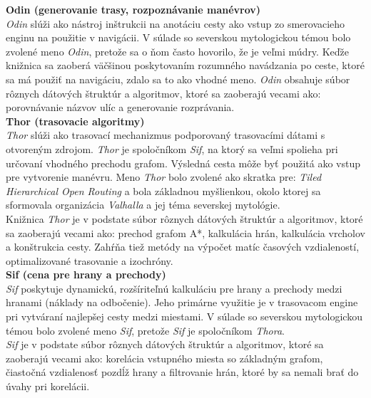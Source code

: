 \noindent \textbf{Odin (generovanie trasy, rozpoznávanie manévrov)}\\
\indent \textit{Odin} slúži ako nástroj inštrukcii na anotáciu cesty ako vstup zo smerovacieho enginu na použitie v navigácii. V súlade so severskou mytologickou témou bolo zvolené meno \textit{Odin}, pretože sa o ňom často hovorilo, že je veľmi múdry. Keďže knižnica sa zaoberá väčšinou poskytovaním rozumného navádzania po ceste, ktoré sa má použiť na navigáciu, zdalo sa to ako vhodné meno. \textit{Odin} obsahuje súbor rôznych dátových štruktúr a algoritmov, ktoré sa zaoberajú vecami ako: porovnávanie názvov ulíc a generovanie rozprávania. \cite{odin}\\

\noindent \textbf{Thor (trasovacie algoritmy)}\\
\indent \textit{Thor} slúži ako trasovací mechanizmus podporovaný trasovacími dátami s otvoreným zdrojom. \textit{Thor} je spoločníkom \textit{Sif}, na ktorý sa veľmi spolieha pri určovaní vhodného prechodu grafom. Výsledná cesta môže byť použitá ako vstup pre vytvorenie manévru. Meno \textit{Thor} bolo zvolené ako skratka pre: \textit{Tiled Hierarchical Open Routing} a bola základnou myšlienkou, okolo ktorej sa sformovala organizácia \textit{Valhalla} a jej téma severskej mytológie.\\
\indent Knižnica \textit{Thor} je v podstate súbor rôznych dátových štruktúr a algoritmov, ktoré sa zaoberajú vecami ako: prechod grafom A*, kalkulácia hrán, kalkulácia vrcholov a konštrukcia cesty. Zahŕňa tiež metódy na výpočet matíc časových vzdialeností, optimalizované trasovanie a izochróny. \cite{thor}\\

\noindent \textbf{Sif (cena pre hrany a prechody)}\\
\indent \textit{Sif} poskytuje dynamickú, rozšíriteľnú kalkuláciu pre hrany a prechody medzi hranami (náklady na odbočenie). Jeho primárne využitie je v trasovacom engine pri vytváraní najlepšej cesty medzi miestami. V súlade so severskou mytologickou témou bolo zvolené meno \textit{Sif}, pretože \textit{Sif} je spoločníkom \textit{Thora}.\\
\indent \textit{Sif} je v podstate súbor rôznych dátových štruktúr a algoritmov, ktoré sa zaoberajú vecami ako: korelácia vstupného miesta so základným grafom, čiastočná vzdialenosť pozdĺž hrany a filtrovanie hrán, ktoré by sa nemali brať do úvahy pri korelácii.\cite{sif} \\

